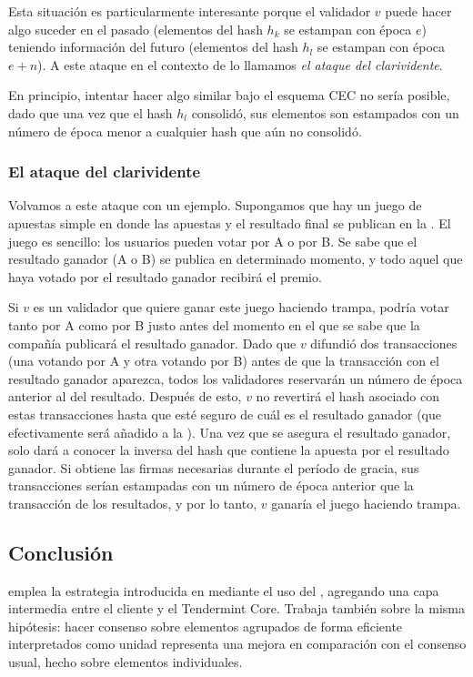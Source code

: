 Esta situación es particularmente interesante porque el validador $v$ puede hacer algo
suceder en el pasado (elementos del hash $h_k$ se estampan con época $e$) teniendo información
del futuro (elementos del hash $h_l$ se estampan con época $e+n$). A este ataque en el contexto
de \hashchain lo llamamos \textit{el ataque del clarividente}.
%

En principio, intentar hacer algo similar bajo el esquema CEC no sería posible, dado
que una vez que el hash $h_l$ consolidó, sus elementos son estampados con un número de época menor
a cualquier hash que aún no consolidó.
%

\subsubsection{El ataque del clarividente}

Volvamos a este ataque con un ejemplo. Supongamos que hay un juego de apuestas simple en donde
las apuestas y el resultado final se publican en la \hashchain. El juego es sencillo: los usuarios
pueden votar por A o por B. Se sabe que el resultado ganador (A o B) se publica en determinado momento,
y todo aquel que haya votado por el resultado ganador recibirá el premio.
%

Si $v$ es un validador que quiere ganar este juego haciendo trampa, podría votar tanto por A
como por B justo antes del momento en el que se sabe que la compañía publicará el resultado ganador.
%
Dado que $v$ difundió dos transacciones (una votando por A y otra votando por B) antes de que la
transacción con el resultado ganador aparezca, todos los validadores reservarán un número de época
anterior al del resultado. Después de esto, $v$ no revertirá el hash asociado con estas transacciones
hasta que esté seguro de cuál es el resultado ganador (que efectivamente será añadido a la \hashchain).
%
Una vez que se asegura el resultado ganador, solo dará a conocer la inversa del hash que contiene la apuesta
por el resultado ganador. Si obtiene las firmas necesarias durante el período de gracia,
sus transacciones serían estampadas con un número de época anterior que la transacción de los resultados,
y por lo tanto, $v$ ganaría el juego haciendo trampa.

\subsection{Conclusión}

\hashchain emplea la estrategia introducida en \compresschain mediante el uso del \collector,
agregando una capa
intermedia entre el cliente y el Tendermint Core.
Trabaja también sobre la misma hipótesis: hacer consenso sobre elementos agrupados de forma eficiente
interpretados como unidad representa una mejora en comparación con el consenso usual, hecho sobre elementos
individuales.

